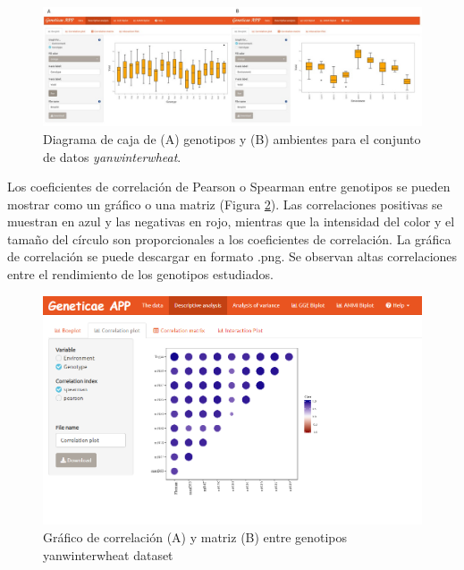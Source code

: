 \begin{figure}[H]
	\begin{center}
		\includegraphics[width=16cm]{./Graficos/Boxplot.jpg}
	\end{center}
	\caption{Diagrama de caja de (A) genotipos y (B) ambientes para el conjunto de datos \emph{yanwinterwheat}.}
	\label{fig:figdesc1}
\end{figure}

Los coeficientes de correlación de Pearson o Spearman entre genotipos se pueden mostrar como un gráfico o una matriz (Figura \ref{fig:figdesc2}). Las correlaciones positivas se muestran en azul y las negativas en rojo, mientras que la intensidad del color y el tamaño del círculo son proporcionales a los coeficientes de correlación. La gráfica de correlación se puede descargar en formato .png. Se observan altas correlaciones entre el rendimiento de los genotipos estudiados. 

\begin{figure}[H]
	\begin{center}
		\includegraphics[width=16cm]{./Graficos/corr_gen.png}
	\end{center}
	\caption{Gráfico de correlación (A) y matriz (B) entre genotipos yanwinterwheat dataset }
	\label{fig:figdesc2}
\end{figure}


